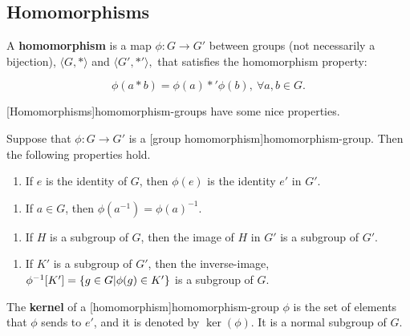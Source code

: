 \documentclass{article}
\begin{document}
\subsection{Homomorphisms}

\begin{definition}
A \textbf{homomorphism} is a map $\phi : G \to G'$ between \@{groups} (not necessarily a bijection), $\langle G, * \rangle$ and $\langle G', *' \rangle,$ that satisfies the homomorphism property:

\[ \phi(a * b) = \phi(a) *' \phi(b), ~ \forall a, b \in G. \]
\end{definition}

\@[Homomorphisms]{homomorphism-groups} have some nice properties.

\begin{proposition}\label{homomorphism-properties}
Suppose that $\phi : G \to G'$ is a \@[group homomorphism]{homomorphism-group}. Then the following properties hold.

\begin{enumerate}
\item If $e$ is the identity of $G$, then $\phi(e)$ is the identity $e'$ in $G'$.
\end{enumerate}

\begin{enumerate}
\item If $a \in G$, then $\phi(a^{-1}) = \phi(a)^{-1}$.
\end{enumerate}

\begin{enumerate}
\item If $H$ is a \@{subgroup} of $G$, then the image of $H$ in $G'$ is a subgroup of $G'$.
\end{enumerate}

\begin{enumerate}
\item If $K'$ is a subgroup of $G'$, then the \@{inverse-image}, $\phi^{-1}[K'] = \left\{ g \in G | \phi(g) \in K' \right\}$ is a subgroup of $G$.
\end{enumerate}
\end{proposition}

\begin{definition}[kernel]
The \textbf{kernel} of a \@[homomorphism]{homomorphism-group} $\phi$ is the set of elements that $\phi$ sends to $e'$, and it is denoted by $\ker{(\phi)}$. It is a \@{normal} \@{subgroup} of $G$.
\end{definition}
\end{document}
